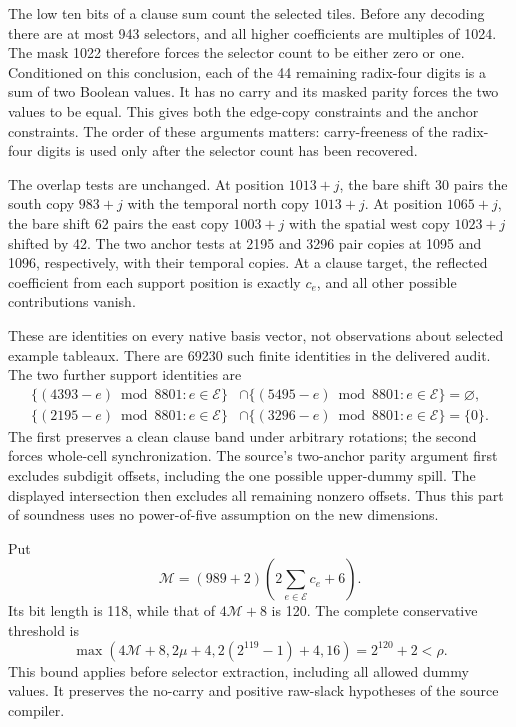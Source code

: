 The low ten bits of a clause sum count the selected tiles. Before any
decoding there are at most 943 selectors, and all higher coefficients
are multiples of 1024. The mask 1022 therefore forces the selector count
to be either zero or one. Conditioned on this conclusion, each of the
44 remaining radix-four digits is a sum of two Boolean values. It has
no carry and its masked parity forces the two values to be equal.
This gives both the edge-copy constraints and the anchor constraints.
The order of these arguments matters: carry-freeness of the radix-four
digits is used only after the selector count has been recovered.

The overlap tests are unchanged. At position $1013+j$, the bare shift
30 pairs the south copy $983+j$ with the temporal north copy $1013+j$.
At position $1065+j$, the bare shift 62 pairs the east copy $1003+j$
with the spatial west copy $1023+j$ shifted by 42. The two anchor tests
at 2195 and 3296 pair copies at 1095 and 1096, respectively, with their
temporal copies. At a clause target, the reflected coefficient from
each support position is exactly $c_e$, and all other possible
contributions vanish.

These are identities on every native basis vector, not observations
about selected example tableaux. There are 69230 such finite identities
in the delivered audit. The two further support identities are
\begin{align*}
 \{(4393-e)\bmod8801:e\in\mathcal E\}
 &\cap\{(5495-e)\bmod8801:e\in\mathcal E\}=\varnothing,\\
 \{(2195-e)\bmod8801:e\in\mathcal E\}
 &\cap\{(3296-e)\bmod8801:e\in\mathcal E\}=\{0\}.
\end{align*}
The first preserves a clean clause band under arbitrary rotations;
the second forces whole-cell synchronization. The source's two-anchor
parity argument first excludes subdigit offsets, including the one
possible upper-dummy spill. The displayed intersection then excludes
all remaining nonzero offsets. Thus this part of soundness uses no
power-of-five assumption on the new dimensions.

Put
\[
 \mathcal M=(989+2)\left(2\sum_{e\in\mathcal E}c_e+6\right).
\]
Its bit length is 118, while that of $4\mathcal M+8$ is 120.
The complete conservative threshold is
\[
 \max(4\mathcal M+8,2\mu+4,2(2^{119}-1)+4,16)
       =2^{120}+2<\rho.
\]
This bound applies before selector extraction, including all allowed
dummy values. It preserves the no-carry and positive raw-slack
hypotheses of the source compiler.

